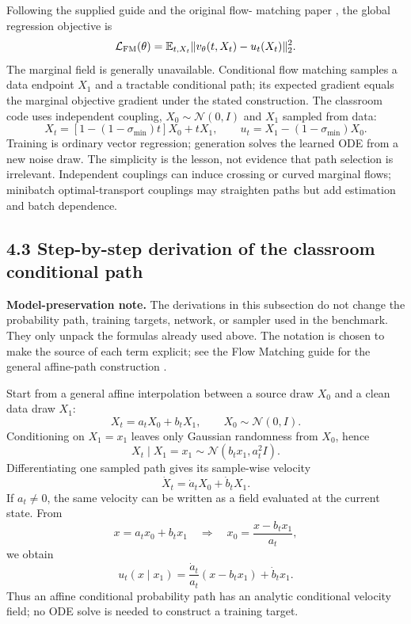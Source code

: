 \documentclass[11pt]{article}
\newcommand{\E}{\mathbb{E}}
\begin{document}
Following the supplied guide \cite{lipman2024guide} and the original flow-
matching paper \cite{lipman2023flow}, the global regression objective is
\[
 \mathcal L_{\rm FM}(\theta)=
 \E_{t,X_t}\lVert v_\theta(t,X_t)-u_t(X_t)\rVert_2^2.
\]
The marginal field is generally unavailable. Conditional flow matching samples a
data endpoint $X_1$ and a tractable conditional path; its expected gradient equals
the marginal objective gradient under the stated construction. The classroom code
uses independent coupling, $X_0\sim\mathcal N(0,I)$ and $X_1$ sampled from data:
\[
 X_t=[1-(1-\sigma_{\min})t]X_0+tX_1,
 \qquad u_t=X_1-(1-\sigma_{\min})X_0.
\]
Training is ordinary vector regression; generation solves the learned ODE from a
new noise draw. The simplicity is the lesson, not evidence that path selection is
irrelevant. Independent couplings can induce crossing or curved marginal flows;
minibatch optimal-transport couplings may straighten paths but add estimation and
batch dependence.


\subsection*{4.3 Step-by-step derivation of the classroom conditional path}

\textbf{Model-preservation note.} The derivations in this subsection do not
change the probability path, training targets, network, or sampler used in the
benchmark. They only unpack the formulas already used above. The notation is
chosen to make the source of each term explicit; see the Flow Matching guide
for the general affine-path construction \cite{lipman2024guide}.

Start from a general affine interpolation between a source draw $X_0$ and a
clean data draw $X_1$:
\[
 X_t=a_tX_0+b_tX_1,\qquad X_0\sim\mathcal N(0,I).
\]
Conditioning on $X_1=x_1$ leaves only Gaussian randomness from $X_0$, hence
\[
 X_t\mid X_1=x_1\sim
 \mathcal N\!\left(b_t x_1,a_t^2I\right).
\]
Differentiating one sampled path gives its sample-wise velocity
\[
 \dot X_t=\dot a_tX_0+\dot b_tX_1.
\]
If $a_t\neq0$, the same velocity can be written as a field evaluated at the
current state. From
\[
 x=a_t x_0+b_t x_1
 \quad\Longrightarrow\quad
 x_0=\frac{x-b_t x_1}{a_t},
\]
we obtain
\[
 u_t(x\mid x_1)
 =\frac{\dot a_t}{a_t}(x-b_t x_1)+\dot b_t x_1.
\]
Thus an affine conditional probability path has an analytic conditional
velocity field; no ODE solve is needed to construct a training target.
\end{document}
